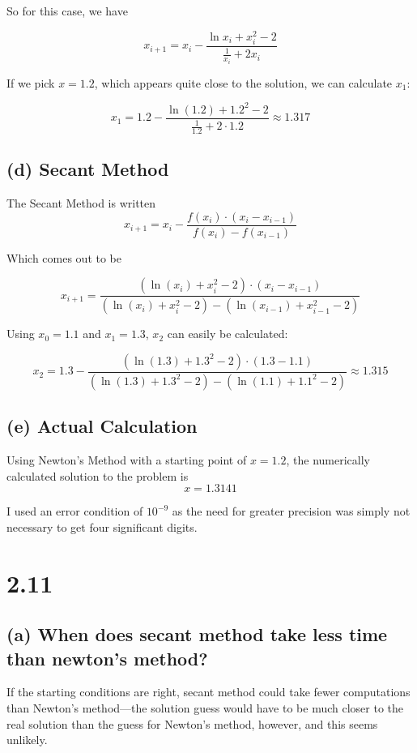 \documentclass{article}[12pt]
\begin{document}
So for this case, we have

$$x_{i+1} = x_i - \frac{\ln x_i + x_i^2 - 2}{\frac{1}{x_i} + 2x_i}$$

If we pick $x = 1.2$, which appears quite close to the solution, we can calculate $x_1$:

$$x_1 = 1.2 - \frac{\ln(1.2) + 1.2^2 - 2}{\frac{1}{1.2} + 2\cdot 1.2} \approx 1.317$$

\subsection*{(d) \normalsize Secant Method}

The Secant Method is written $$x_{i+1} = x_i - \frac{f(x_i)\cdot (x_i - x_{i-1})}{f(x_i) - f(x_{i-1})}$$

Which comes out to be 

$$x_{i+1} = \frac{(\ln(x_i)+x_i^2-2)\cdot (x_i - x_{i-1})}{(\ln(x_i) + x_i^2 - 2) - (\ln(x_{i-1}) + x_{i-1}^2 -2)}$$

Using $x_0 = 1.1$ and $x_1 = 1.3$, $x_2$ can easily be calculated:

$$x_2 = 1.3 - \frac{(\ln(1.3) + 1.3^2 -2)\cdot (1.3-1.1)}{(\ln(1.3) + 1.3^2 -2)-(\ln(1.1) + 1.1^2 -2)} \approx 1.315$$

\subsection*{(e) \normalsize Actual Calculation}

Using Newton's Method with a starting point of $x = 1.2$, the numerically calculated solution to the problem is $$x = 1.3141$$

I used an error condition of $10^{-9}$ as the need for greater precision was simply not necessary to get four significant digits.

\section*{2.11}

\subsection*{(a) \normalsize When does secant method take less time than newton's method?}

If the starting conditions are right, secant method could take fewer computations than Newton's method---the solution guess would have to be much closer to the real solution than the guess for Newton's method, however, and this seems unlikely.
\end{document}
